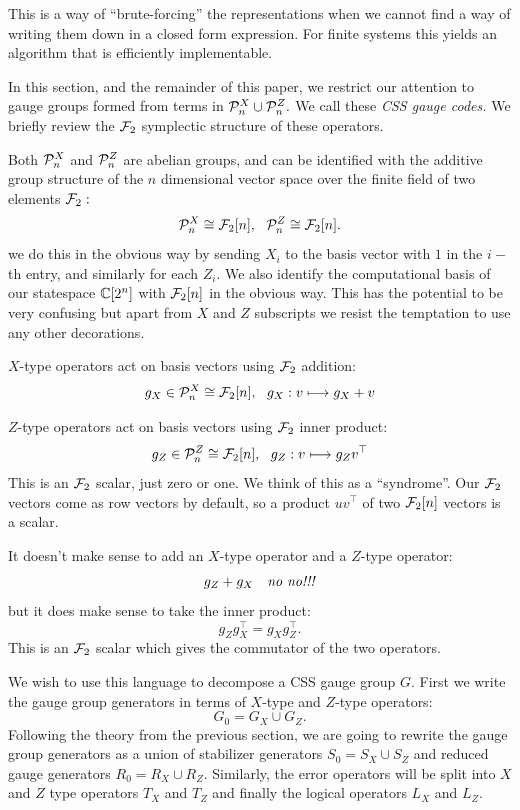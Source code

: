 \documentclass[12pt]{article}
\begin{document}
This is a way of ``brute-forcing'' the representations when
we cannot find a way of writing them down in a closed form expression.
For finite systems this yields an algorithm that is efficiently implementable.

In this section, and the remainder of this paper,
we restrict our
attention to gauge groups formed from terms 
in $\mathcal{P}_n^X\cup\mathcal{P}_n^Z.$
We call these \emph{CSS gauge codes.}
We briefly review the $\mathcal{F}_2$ symplectic structure of
these operators.

Both $\mathcal{P}^X_n$ and $\mathcal{P}^Z_n$ are abelian groups,
and can be identified with the additive 
group structure of the $n$ dimensional vector space
over the finite field of two elements $\mathcal{F}_2:$
$$
    \Pauli^X_n \cong \Fn,  \ \ 
    \Pauli^Z_n \cong \Fn. 
$$
we do this in the obvious way by sending $X_i$ to the basis vector with
$1$ in the $i-$th entry, and similarly for each $Z_i$. 
We also identify the computational basis of our statespace $\mathbb{C}[2^n]$
with $\mathcal{F}_2[n]$ in the obvious way.
This has the potential to be very confusing but 
apart from $X$ and $Z$ subscripts
we resist the temptation to
use any other decorations.

$X$-type operators act on basis vectors using $\mathcal{F}_2$ addition:
$$
    g_X \in \mathcal{P}^X_n \cong \mathcal{F}_2[n], \ \ g_X : v \longmapsto g_X + v
$$

$Z$-type operators act on basis vectors using $\mathcal{F}_2$ inner product:
$$
    g_Z \in \mathcal{P}^Z_n \cong \mathcal{F}_2[n], \ \ g_Z : v \longmapsto g_Z v^\top
$$
This is an $\mathcal{F}_2$ scalar, just zero or one. We think of this
as a ``syndrome''.
Our $\mathcal{F}_2$ vectors come as row vectors by default,
so a product $u v^\top$ of
two $\mathcal{F}_2[n]$ vectors is a scalar.

It doesn't make sense to add an $X$-type operator and
a $Z$-type operator:
$$
    g_Z + g_X \ \ \ \mbox{\emph{no no!!!}}
$$
but it does make sense to take the inner product:
$$
    g_Z g_X^\top = g_X g_Z^\top.
$$
This is an $\mathcal{F}_2$ scalar which gives the commutator of the 
two operators.

We wish to use this language to decompose a CSS gauge group $G.$
First we write the gauge group generators in terms of
$X$-type and $Z$-type operators:
$$
    G_0 = G_X \cup G_Z.
$$
Following the theory from the previous section,
we are going to rewrite the gauge group generators
as a union of stabilizer generators $S_0 = S_X \cup S_Z$
and reduced gauge generators $R_0 = R_X \cup R_Z.$
Similarly, the error operators
will be split into $X$ and $Z$ type
operators $T_X$ and $T_Z$ and
finally the logical operators
$L_X$ and $L_Z.$
\end{document}
